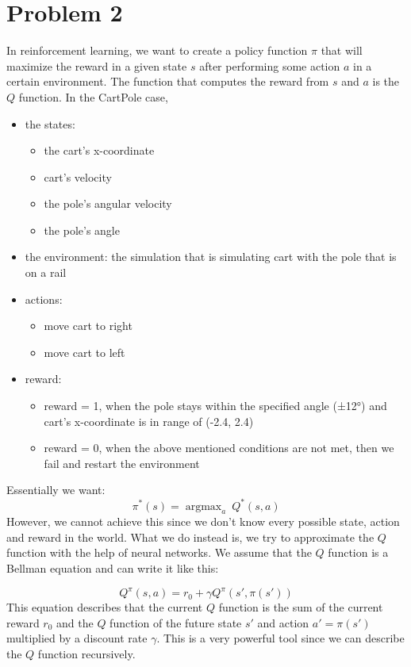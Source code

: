 \documentclass{article}
\numberwithin{equation}{section}
\DeclareMathOperator*{\argmax}{argmax} %
\numberwithin{equation}{section}
\begin{document}
\section*{Problem 2}
In reinforcement learning, we want to create a policy function $\pi$ that will maximize the reward in a given state $s$ after performing some action $a$ in a certain environment. The function that computes the reward from $s$ and $a$ is the $Q$ function. In the CartPole case,
\begin{itemize}
\item the states: 
\begin{itemize}
\item the cart's x-coordinate
\item cart's velocity
\item the pole's angular velocity
\item the pole's angle
\end{itemize}
\item the environment: the simulation that is simulating cart with the pole that is on a rail
\item actions:
\begin{itemize}
\item move cart to right
\item move cart to left
\end{itemize} 
\item reward:
\begin{itemize}
\item reward = 1, when the pole stays within the specified angle (±12°) and cart's x-coordinate is in range of (-2.4, 2.4)
\item reward = 0, when the above mentioned conditions are not met, then we fail and restart the environment
\end{itemize} 
\end{itemize}  

Essentially we want:
$$
\pi^*(s) = \argmax_a \ Q^*(s,a)
$$
However, we cannot achieve this since we don't know every possible state, action and reward in the world. What we do instead is, we try to approximate the $Q$ function with the help of neural networks. We assume that the $Q$ function is a Bellman equation and can write it like this:

$$
Q^{\pi}(s,a) = r_0 + \gamma Q^{\pi}(s',\pi(s'))
$$
This equation describes that the current $Q$ function is the sum of the current reward $r_0$ and the $Q$ function of the future state $s'$ and action $a' = \pi(s')$ multiplied by a discount rate $\gamma$. This is a very powerful tool since we can describe the $Q$ function recursively.
\end{document}
